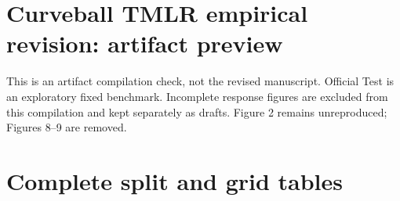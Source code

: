 \documentclass[10pt]{article}
\begin{document}
\section*{Curveball TMLR empirical revision: artifact preview}
This is an artifact compilation check, not the revised manuscript. Official Test is an exploratory fixed benchmark. Incomplete response figures are excluded from this compilation and kept separately as drafts. Figure 2 remains unreproduced; Figures 8--9 are removed.
\clearpage
\setcounter{table}{0}

\clearpage
\setcounter{table}{1}

\clearpage
\setcounter{table}{2}

\clearpage
\setcounter{table}{3}

\clearpage

\clearpage
\appendix
\section{Complete split and grid tables}

\clearpage

\clearpage

\clearpage

\clearpage

\clearpage

\clearpage

\clearpage

\clearpage

\clearpage

\clearpage

\clearpage

\clearpage
\end{document}
